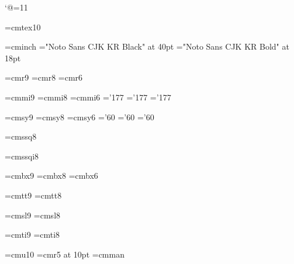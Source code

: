 %
\catcode`@=11 %

\font\tentex=cmtex10

\font\inchhigh=cminch
\font\titlefont="Noto Sans CJK KR Black" at 40pt
\font\sectitlefont="Noto Sans CJK KR Bold" at 18pt

\font\ninerm=cmr9
\font\eightrm=cmr8
\font\sixrm=cmr6

\font\ninei=cmmi9
\font\eighti=cmmi8
\font\sixi=cmmi6
\skewchar\ninei='177 \skewchar\eighti='177 \skewchar\sixi='177

\font\ninesy=cmsy9
\font\eightsy=cmsy8
\font\sixsy=cmsy6
\skewchar\ninesy='60 \skewchar\eightsy='60 \skewchar\sixsy='60

\font\eightss=cmssq8

\font\eightssi=cmssqi8

\font\ninebf=cmbx9
\font\eightbf=cmbx8
\font\sixbf=cmbx6

\font\ninett=cmtt9
\font\eighttt=cmtt8

\hyphenchar{} %
\hyphenchar{}
\hyphenchar{}

\font\ninesl=cmsl9
\font\eightsl=cmsl8

\font\nineit=cmti9
\font\eightit=cmti8

\font\tenu=cmu10 %
\font\magnifiedfiverm=cmr5 at 10pt
\font\cmman=cmman %

%
\newskip\ttglue
\def\tenpoint{\def\rm{\fam0\tenrm}%
  \textfont0=\tenrm \scriptfont0=\sevenrm \scriptscriptfont0=\fiverm
  \textfont1=\teni \scriptfont1=\seveni \scriptscriptfont1=\fivei
  \textfont2=\tensy \scriptfont2=\sevensy \scriptscriptfont2=\fivesy
  \textfont3=\tenex \scriptfont3=\tenex \scriptscriptfont3=\tenex
  \setmathhangulfonts\texthangul\scripthangul\scriptscripthangul
  \def\it{\fam\itfam\tenit}%
  \textfont\itfam=\tenit
  \def\sl{\fam\slfam\tensl}%
  \textfont\slfam=\tensl
  \def\bf{\fam\bffam\tenbf}%
  \textfont\bffam=\tenbf \scriptfont\bffam=\sevenbf
   \scriptscriptfont\bffam=\fivebf
  \def\tt{\fam\ttfam\tentt}%
  \textfont\ttfam=\tentt
  \expandafter\def\expandafter\rm\expandafter{\rm\tenmj}
  \expandafter\def\expandafter\tt\expandafter{\tt\tentz}
  \expandafter\def\expandafter\bf\expandafter{\bf\tenbd}
  \expandafter\def\expandafter\sl\expandafter{\sl\tensn}
  \expandafter\def\expandafter\it\expandafter{\it\tensn}  
  \tt \ttglue=.5em plus.25em minus.15em
  \normalbaselineskip=15pt
  \let\sc=\eightrm
  \let\big=\tenbig
  \setbox\strutbox=\hbox{\vrule height8.5pt depth3.5pt width\z@}%
  \normalbaselines\rm}

